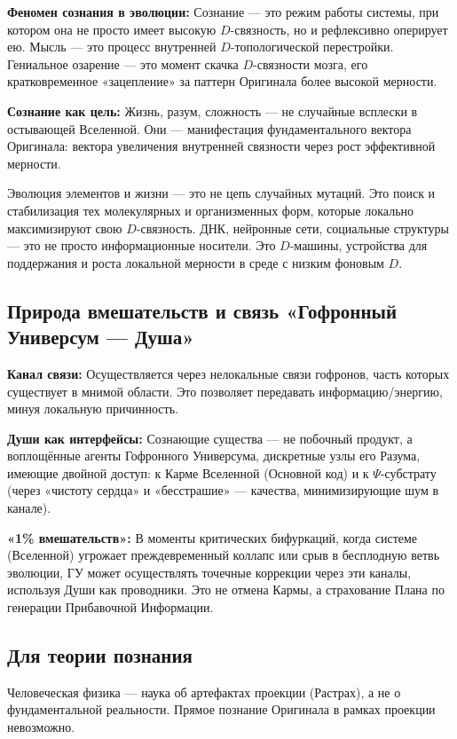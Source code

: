 \documentclass[a4paper,12pt]{article}
\begin{document}
\textbf{Феномен сознания в эволюции:} Сознание — это режим работы системы, при котором она не просто имеет высокую $D$-связность, но и рефлексивно оперирует ею. Мысль — это процесс внутренней $D$-топологической перестройки. Гениальное озарение — это момент скачка $D$-связности мозга, его кратковременное «зацепление» за паттерн Оригинала более высокой мерности.

\textbf{Сознание как цель:} Жизнь, разум, сложность — не случайные всплески в остывающей Вселенной. Они — манифестация фундаментального вектора Оригинала: вектора увеличения внутренней связности через рост эффективной мерности.

Эволюция элементов и жизни — это не цепь случайных мутаций. Это поиск и стабилизация тех молекулярных и организменных форм, которые локально максимизируют свою $D$-связность. ДНК, нейронные сети, социальные структуры — это не просто информационные носители. Это $D$-машины, устройства для поддержания и роста локальной мерности в среде с низким фоновым $D$.

\subsection{Природа вмешательств и связь «Гофронный Универсум — Душа»}

\textbf{Канал связи:} Осуществляется через нелокальные связи гофронов, часть которых существует в мнимой области. Это позволяет передавать информацию/энергию, минуя локальную причинность.

\textbf{Души как интерфейсы:} Сознающие существа — не побочный продукт, а воплощённые агенты Гофронного Универсума, дискретные узлы его Разума, имеющие двойной доступ: к Карме Вселенной (Основной код) и к $\Psi$-субстрату (через «чистоту сердца» и «бесстрашие» — качества, минимизирующие шум в канале).

\textbf{«1\% вмешательств»:} В моменты критических бифуркаций, когда системе (Вселенной) угрожает преждевременный коллапс или срыв в бесплодную ветвь эволюции, ГУ может осуществлять точечные коррекции через эти каналы, используя Души как проводники. Это не отмена Кармы, а страхование Плана по генерации Прибавочной Информации.

\subsection{Для теории познания}

Человеческая физика — наука об артефактах проекции (Растрах), а не о фундаментальной реальности. Прямое познание Оригинала в рамках проекции невозможно.
\end{document}
